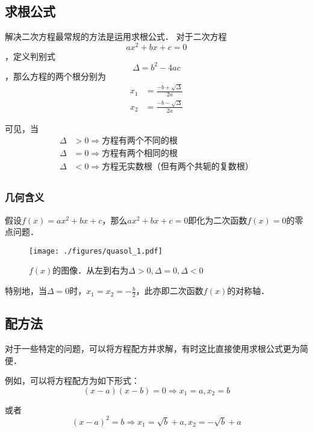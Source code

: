
\subsection{求根公式}
解决二次方程最常规的方法是运用求根公式．
对于二次方程$$ax^2+bx+c=0$$，定义判别式$$\Delta = b^2-4ac$$，那么方程的两个根分别为$$
\begin{aligned}
x_1&=\frac{-b+\sqrt{\Delta}}{2a}\\
x_2&=\frac{-b-\sqrt{\Delta}}{2a}
\end{aligned}
$$

可见，当
$$
\begin{aligned}
\Delta &> 0 \Rightarrow \text{方程有两个不同的根}\\
\Delta &= 0 \Rightarrow \text{方程有两个相同的根}\\
\Delta &< 0 \Rightarrow \text{方程无实数根（但有两个共轭的复数根）}\\
\end{aligned}
$$

\subsubsection{几何含义}
假设$f(x)=ax^2+bx+c$，那么$ax^2+bx+c=0$即化为二次函数$f(x)=0$的零点问题．
\begin{figure}[ht]
\centering
\texttt{[image: ./figures/quasol\_1.pdf]}
\caption{$f(x)$的图像．从左到右为$\Delta > 0, \Delta = 0, \Delta < 0$} \label{quasol_fig1}
\end{figure}
特别地，当$\Delta =0$时，$x_1=x_2=-\frac{b}{2}$，此亦即二次函数$f(x)$的对称轴．

\subsection{配方法}
对于一些特定的问题，可以将方程配方并求解，有时这比直接使用求根公式更为简便．

例如，可以将方程配方为如下形式：
$$(x-a)(x-b)=0\Rightarrow x_1=a, x_2=b$$

或者
$$(x-a)^2=b\Rightarrow x_1=\sqrt{b}+a, x_2=-\sqrt{b}+a$$
